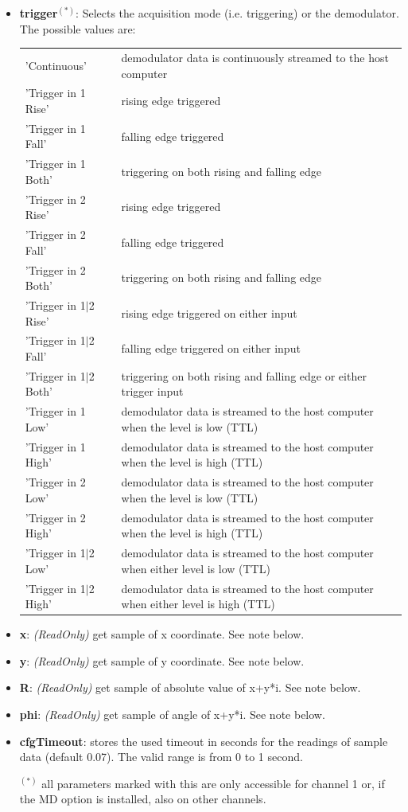 \documentclass[11pt]{article} %
\begin{document}
\begin{itemize}
	\item {\bf trigger}$^{(*)}$: Selects the acquisition mode (i.e. triggering) or the demodulator. The possible values are:
	\setlength{\LTleft}{0.9cm}
	\begin{longtable}{p{3.1cm}p{12.7cm}}
	'Continuous' & demodulator data is continuously streamed to the host computer \\
	'Trigger in 1 Rise' & rising edge triggered \\
	'Trigger in 1 Fall' & falling edge triggered \\
	'Trigger in 1 Both' & triggering on both rising and falling edge \\
	'Trigger in 2 Rise' & rising edge triggered \\
	'Trigger in 2 Fall' & falling edge triggered \\
	'Trigger in 2 Both' & triggering on both rising and falling edge \\
	'Trigger in 1$\mid$2 Rise' & rising edge triggered on either input \\
	'Trigger in 1$\mid$2 Fall' & falling edge triggered on either input \\
	'Trigger in 1$\mid$2 Both' & triggering on both rising and falling edge or either trigger input \\
	'Trigger in 1 Low' & demodulator data is streamed to the host computer when the level is low (TTL) \\
	'Trigger in 1 High' & demodulator data is streamed to the host computer when the level is high (TTL) \\
	'Trigger in 2 Low' & demodulator data is streamed to the host computer when the level is low (TTL) \\
	'Trigger in 2 High' & demodulator data is streamed to the host computer when the level is high (TTL) \\
	'Trigger in 1$\mid$2 Low' & demodulator data is streamed to the host computer when either level is low (TTL) \\
	'Trigger in 1$\mid$2 High' & demodulator data is streamed to the host computer when either level is high (TTL) \\
	\end{longtable}
	\item {\bf x}: {\it (ReadOnly)} get sample of x coordinate. See note below.
	\item {\bf y}: {\it (ReadOnly)} get sample of y coordinate. See note below.
	\item {\bf R}: {\it (ReadOnly)} get sample of absolute value of x+y*i. See note below.
	\item {\bf phi}: {\it (ReadOnly)} get sample of angle of x+y*i. See note below.
	\item {\bf cfgTimeout}: stores the  used timeout in seconds for the readings of sample data (default 0.07). The valid range is from 0 to 1 second.
	\item[$^{(*)}$] all parameters marked with this are only accessible for channel 1 or, if the MD option is installed, also on other channels.
	\end{itemize}
\end{document}
